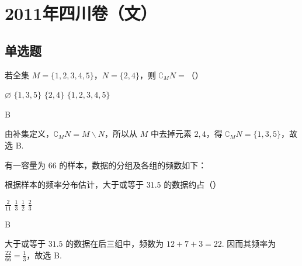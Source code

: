 \chapter{2011年四川卷（文）}

\section{单选题}

\begin{problem}
若全集 \(M = \{1, 2, 3, 4, 5\}\)，\(N = \{2, 4\}\)，则 \(\complement_{M}N =\)（\quad）

\choices
    {\(\varnothing\)}
    {\(\{1, 3, 5\}\)}
    {\(\{2, 4\}\)}
    {\(\{1, 2, 3, 4, 5\}\)}
\end{problem}

\begin{answer}
B
\end{answer}

\begin{solution}
由补集定义，\(\complement_{M}N=M\mathbin{\backslash}N\)，所以从 \(M\) 中去掉元素 \(2,4\)，得 \(\complement_{M}N=\{1,3,5\}\)，故选 B.
\end{solution}

\begin{problem}
有一容量为 \(66\) 的样本，数据的分组及各组的频数如下：
\begin{center}
\resizebox{\linewidth}{!}{%
\begin{tabular}{|c|c|c|c|c|c|c|c|}
\hline
\([11.5, 15.5)\) & \([15.5, 19.5)\) & \([19.5, 23.5)\) & \([23.5, 27.5)\) & \([27.5, 31.5)\) & \([31.5, 35.5)\) & \([35.5, 39.5)\) & \([39.5, 43.5)\) \\
\hline
2 & 4 & 9 & 18 & 11 & 12 & 7 & 3 \\
\hline
\end{tabular}%
}
\end{center}
根据样本的频率分布估计，大于或等于 \(31.5\) 的数据约占（\quad）

\choices
    {\(\frac{2}{11}\)}
    {\(\frac{1}{3}\)}
    {\(\frac{1}{2}\)}
    {\(\frac{2}{3}\)}
\end{problem}

\begin{answer}
B
\end{answer}

\begin{solution}
大于或等于 \(31.5\) 的数据在后三组中，频数为 \(12+7+3=22\). 因而其频率为 \(\frac{22}{66}=\frac{1}{3}\)，故选 B.
\end{solution}

